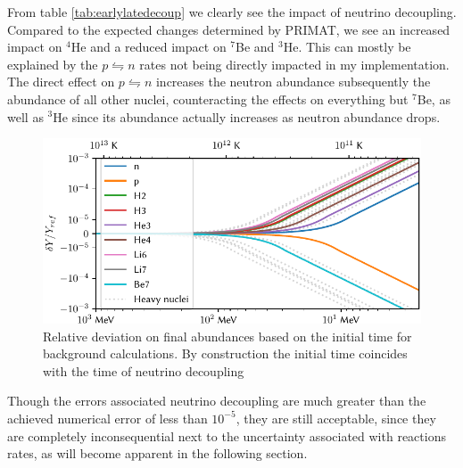 From table \ref{tab:earlylatedecoup} we clearly see the impact of neutrino decoupling. Compared to the expected changes determined by PRIMAT\cite{PRIMAT}, we see an increased impact on ${}^4$He and a reduced impact on ${}^7$Be and ${}^3$He. This can mostly be explained by the $p\leftrightharpoons n$ rates not being directly impacted in my implementation. The direct effect on $p\leftrightharpoons n$ increases the neutron abundance subsequently the abundance of all other nuclei, counteracting the effects on everything but ${}^7$Be, as well as ${}^3$He since its abundance actually increases as neutron abundance drops.%
\begin{figure}[ht]
    \includegraphics[width=5.1in]{figures/initime.pdf}
    \caption{Relative deviation on final abundances based on the initial time for background calculations. By construction the initial time coincides with the time of neutrino decoupling}
    \label{fig:initime}
\end{figure}

Though the errors associated neutrino decoupling are much greater than the achieved numerical error of less than $10^{-5}$, they are still acceptable, since they are completely inconsequential next to the uncertainty associated with reactions rates, as will become apparent in the following section.


